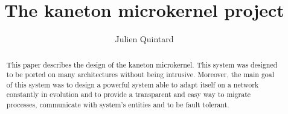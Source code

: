 
%
%



%
%


%
%

\title{The kaneton microkernel project}

%
%

\author{\small{Julien Quintard}}

%
%



%
%

\maketitle


\begin{abstract}

This paper describes the design of the kaneton microkernel.
This system was designed to be ported on many architectures without being
intrusive. Moreover, the main goal of this system was to design a powerful
system able to adapt itself on a network constantly in evolution and to
provide a transparent and easy way to migrate processes, communicate
with system's entities and to be fault tolerant.

\end{abstract}

%
%


